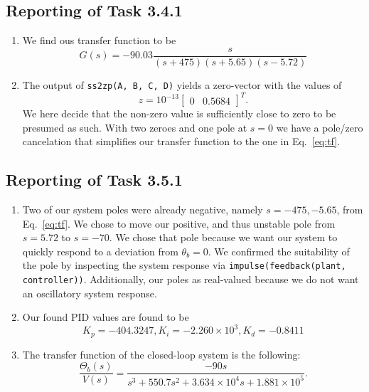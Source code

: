 \documentclass[11pt]{article} %
\begin{document}
\subsection*{Reporting of Task 3.4.1}
\begin{enumerate}
\item %
We find ous transfer function to be
\begin{equation}\label{eq:tf}
  G(s) = -90.03\frac{s}{(s + 475)(s + 5.65)(s - 5.72)}
\end{equation}

\item %
  The output of \texttt{ss2zp(A, B, C, D)} yields a zero-vector with
  the values of $$z = 10^{-13}\begin{bmatrix} 0 & 0.5684 \end{bmatrix}^T.$$
  We here decide that the non-zero value is sufficiently close to zero
  to be presumed as such. With two zeroes and one pole at $s = 0$ we
  have a pole/zero cancelation that simplifies our transfer function
  to the one in Eq.~\eqref{eq:tf}.
\end{enumerate}

\subsection*{Reporting of Task 3.5.1}
\begin{enumerate}
\item %
  Two of our system poles were already negative, namely $s = -475,
  -5.65$, from Eq.~\eqref{eq:tf}. We chose to move our positive, and
  thus unstable pole from $s = 5.72$ to $s = -70$. We chose that pole
  because we want our system to quickly respond to a deviation from
  $\theta_b = 0$. We confirmed the suitability of the pole by
  inspecting the system response via \texttt{impulse(feedback(plant, controller))}.
  Additionally, our poles as real-valued because we do not want an oscillatory system response.
\item %
  Our found \ac{PID} values are found to be
  \begin{equation}\label{eq:pid}
  K_p = -404.3247, K_i = -2.260 \times 10^3, K_d = -0.8411
  \end{equation}
\item %
  The transfer function of the closed-loop system is the following:
  $$
  \frac{\Theta_b(s)}{V(s)} =
  \frac{-90s}{
    s^3
    + 550.7s^2
    + 3.634 \times 10^4 s
    + 1.881 \times 10^5
  }.
  $$
\end{enumerate}
\end{document}

